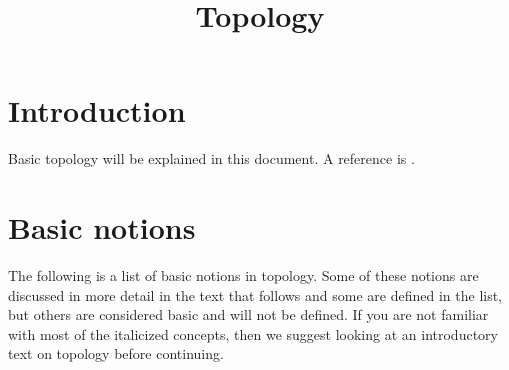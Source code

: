 

%


\title{Topology}


\maketitle

\label{section-phantom}

\tableofcontents

\section{Introduction}
\label{section-introduction}

\noindent
Basic topology will be explained in this document.
A reference is \cite{Engelking}.

\section{Basic notions}
\label{section-topology-basic}

\noindent
The following is a list of basic notions in topology. Some of these notions
are discussed in more detail in the text that follows and some
are defined in the list, but others are considered basic and will not
be defined. If you are not familiar with most of the italicized concepts,
then we suggest looking at an introductory text on topology before
continuing.

